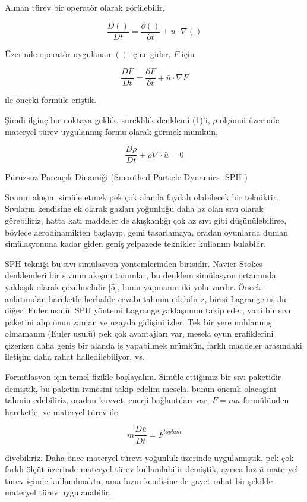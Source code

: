 \documentclass[12pt,fleqn]{article}\usepackage{../../common}
\begin{document}
Alınan türev bir operatör olarak görülebilir, 

$$
\frac{D ()}{D t} = \frac{\partial () }{\partial t} + \bar{u} \cdot \nabla ()
$$

Üzerinde operatör uygulanan $()$ içine gider, $F$ için

$$
\frac{D F}{D t} = \frac{\partial F}{\partial t} + \bar{u} \cdot \nabla F
$$

ile önceki formüle eriştik.

Şimdi ilginç bir noktaya geldik, süreklilik denklemi (1)'i, $\rho$ ölçümü
üzerinde materyel türev uygulanmış formu olarak görmek mümkün,

$$
\frac{D \rho}{D t} + \rho \nabla \cdot \bar{u} = 0
$$

Pürüzsüz Parcaçık Dinamiği (Smoothed Particle Dynamics -SPH-)

Sıvının akışını simüle etmek pek çok alanda faydalı olabilecek bir
tekniktir. Sıvıların kendisine ek olarak gazları yoğunluğu daha az olan sıvı
olarak görebiliriz, hatta katı maddeler de akışkanlığı çok az sıvı gibi
düşünülebilirse, böylece aerodinamikten başlayıp, gemi tasarlamaya, oradan
oyunlarda duman simülasyonuna kadar giden geniş yelpazede teknikler kullanım
bulabilir.

SPH tekniği bu sıvı simülasyon yöntemlerinden birisidir. Navier-Stokes
denklemleri bir sıvının akışını tanımlar, bu denklem simülasyon ortamında
yaklaşık olarak çözülmelidir [5], bunu yapmanın iki yolu vardır. Önceki
anlatımdan hareketle herhalde cevabı tahmin edebiliriz, birisi Lagrange usulü
diğeri Euler usulü. SPH yöntemi Lagrange yaklaşımını takip eder, yani bir sıvı
paketini alıp onun zaman ve uzayda gidişini izler. Tek bir yere mıhlanmış
olmamanın (Euler usulü) pek çok avantajları var, mesela oyun grafiklerini
çizerken daha geniş bir alanda iş yapabilmek mümkün, farklı maddeler arasındaki
iletişim daha rahat halledilebiliyor, vs.

Formülasyon için temel fizikle başlayalım. Simüle ettiğimiz bir sıvı paketidir
demiştik, bu paketin ivmesini takip edelim mesela, bunun önemli olacagini tahmin
edebiliriz, oradan kuvvet, enerji bağlantıları var, $F=ma$ formülünden
hareketle, ve materyel türev ile

$$
m \frac{D \bar{u}}{D t} = F^{toplam}
$$

diyebiliriz. Daha önce materyel türevi yoğunluk üzerinde uygulamıştık, pek çok
farklı ölçüt üzerinde materyel türev kullanılabilir demiştik, ayrıca hız
$\bar{u}$ materyel türev içinde kullanılmakta, ama hızın kendisine de gayet
rahat bir şekilde materyel türev uygulanabilir.
\end{document}
